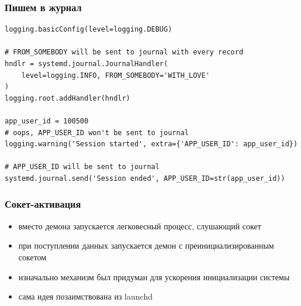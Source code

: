 \documentclass[aspectratio=169]{beamer}
\begin{document}
\begin{frame}[fragile]
  \frametitle{Пишем в журнал}
  
  \begin{lstlisting}
logging.basicConfig(level=logging.DEBUG)

# FROM_SOMEBODY will be sent to journal with every record
hndlr = systemd.journal.JournalHandler(
    level=logging.INFO, FROM_SOMEBODY='WITH_LOVE'
)
logging.root.addHandler(hndlr)

app_user_id = 100500
# oops, APP_USER_ID won't be sent to journal
logging.warning('Session started', extra={'APP_USER_ID': app_user_id})

# APP_USER_ID will be sent to journal
systemd.journal.send('Session ended', APP_USER_ID=str(app_user_id))
  \end{lstlisting}

\end{frame}


\begin{frame}
  \frametitle{Сокет-активация}

  \begin{itemize}
  \item вместо демона запускается легковесный процесс, слушающий сокет
  \item при поступлении данных запускается демон с преинициализированным сокетом
  \item изначально механизм был придуман для ускорения инициализации системы
  \item сама идея позаимствована из launchd
  \end{itemize}

\end{frame}
\end{document}
